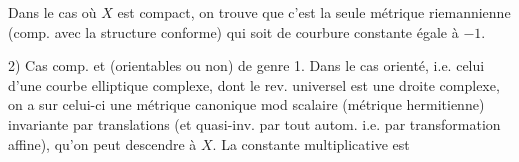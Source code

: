 Dans le cas où $X$ est compact, on trouve que c'est la seule métrique riemannienne (comp. avec la structure conforme) qui soit de courbure constante égale à $-1$.

2) Cas  comp. et (orientables ou non) de genre 1. Dans le cas orienté, i.e. celui d'une courbe elliptique complexe, dont le rev. universel est une droite complexe, on a sur celui-ci une métrique canonique mod scalaire (métrique hermitienne) invariante par translations (et quasi-inv. par tout autom. i.e. par transformation affine), qu'on peut descendre à $X$. La constante multiplicative est
